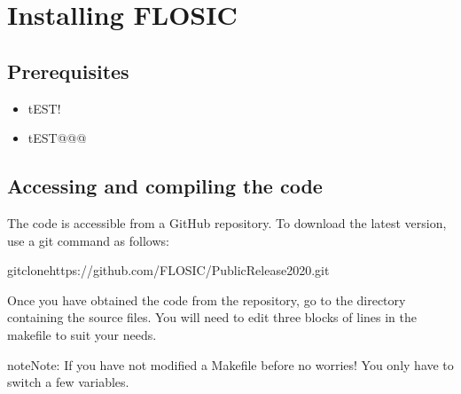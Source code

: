 \documentclass[letterpaper,10pt,english,openany,oneside]{sphinxmanual}
\begin{document}
\sphinxstepscope


\chapter{Installing FLOSIC}
\label{\detokenize{docs/install/toc:installing-flosic}}\label{\detokenize{docs/install/toc::doc}}
\sphinxstepscope


\section{Prerequisites}
\label{\detokenize{docs/install/Prerequisites:prerequisites}}\label{\detokenize{docs/install/Prerequisites::doc}}\begin{description}
\begin{itemize}
\item {} 
\sphinxAtStartPar
tEST!

\item {} 
\sphinxAtStartPar
tEST@@@

\end{itemize}

\end{description}

\sphinxstepscope


\section{Accessing and compiling the code}
\label{\detokenize{docs/install/Build:accessing-and-compiling-the-code}}\label{\detokenize{docs/install/Build::doc}}
\sphinxAtStartPar
The code is accessible from a GitHub repository. To download the latest version, use a git command as follows:

\begin{sphinxVerbatim}[commandchars=\\\{\}]
gitclonehttps://github.com/FLOSIC/PublicRelease\PYGZus{}2020.git
\end{sphinxVerbatim}

\sphinxAtStartPar
Once you have obtained the code from the repository, go to the directory containing the source files.  You will
need to edit three blocks of lines in the makefile to suit your needs.

\begin{sphinxadmonition}{note}{Note:}
\sphinxAtStartPar
If you have not modified a Makefile before \sphinxhyphen{} no worries!
You only have to switch a few variables.
\end{sphinxadmonition}
\end{document}

